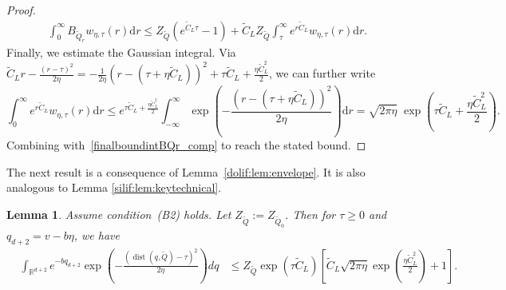 \documentclass[11pt,letterpaper]{article}
\newcommand{\R}{\mathbb{R}}
\newcommand{\Q}{\widetilde{Q}}
\newcommand{\dist}{\operatorname{dist}}
\newcommand{\D}{\mathrm{d}}
\newcommand{\brac}[1]{\left( #1\right)}
\newtheorem{lemma}[thm]{Lemma}
\begin{document}
\begin{proof}
\begin{align}
\label{finalboundintBQr_comp}
\int_{0}^{\infty} B_{\Q_r}   w_{\eta,\tau}(r)  \D r
\le Z_{\Q}\left(e^{\widetilde{C}_L\tau}-1\right)+\widetilde{C}_L Z_{\Q}\int_{\tau}^{\infty} e^{r\widetilde{C}_L}w_{\eta,\tau}(r)  \D r.
\end{align}
Finally, we estimate the Gaussian integral. Via $\widetilde{C}_L r-\frac{(r-\tau)^2}{2\eta}
=-\frac{1}{2\eta}\left(r-(\tau+\eta \widetilde{C}_L)\right)^2+\tau \widetilde{C}_L+\frac{\eta \widetilde{C}_L^2}{2}$, we can further write 
\[\int_{0}^{\infty} e^{r\widetilde{C}_L}w_{\eta,\tau}(r)  \D r
\le e^{\tau \widetilde{C}_L+\frac{\eta \widetilde{C}_L^2}{2}}
\int_{-\infty}^{\infty}\exp \left(-\frac{(r-(\tau+\eta \widetilde{C}_L))^2}{2\eta}\right)  \D r=\sqrt{2\pi\eta}\;\exp \left(\tau \widetilde{C}_L+\frac{\eta \widetilde{C}_L^2}{2}\right).\] Combining with~\eqref{finalboundintBQr_comp} to reach the stated bound. 
\end{proof}


The next result is a consequence of Lemma~\ref{dolif:lem:envelope}. 
It is also analogous to Lemma \ref{silif:lem:keytechnical}.

\begin{lemma}
\label{dolif:lem:keytechnical}
Assume condition~(B2) holds. Let $Z_{\Q}:=Z_{\Q_0}$. Then for $\tau\geq 0$ and $ q_{d+2}=v-b\eta$, we have \begin{align*}&\int_{\R^{d+2}} e^{-bq_{d+2}} \exp\brac{-\frac{\brac{\dist ( q,\Q)-\tau}^2}{2\eta}}d q &\le Z_{\Q} \exp(\tau \widetilde{C}_L) \left[ 
     \widetilde{C}_L \sqrt{2\pi\eta} \exp\brac{ \frac{\eta \widetilde{C}_L^2}{2}} +1\right].
    \end{align*}
\end{lemma}
\end{document}
